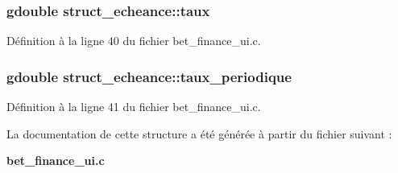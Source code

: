 \subsubsection[{taux}]{\setlength{\rightskip}{0pt plus 5cm}gdouble {\bf struct\_\-echeance::taux}}\label{structstruct__echeance_a1959986af776e4365ba4a8e6a009aa8b}


Définition à la ligne 40 du fichier bet\_\-finance\_\-ui.c.

\subsubsection[{taux\_\-periodique}]{\setlength{\rightskip}{0pt plus 5cm}gdouble {\bf struct\_\-echeance::taux\_\-periodique}}\label{structstruct__echeance_ae191c46200780181e2c8edca774d2e2a}


Définition à la ligne 41 du fichier bet\_\-finance\_\-ui.c.



La documentation de cette structure a été générée à partir du fichier suivant :\begin{DoxyCompactItemize}
\item 
{\bf bet\_\-finance\_\-ui.c}\end{DoxyCompactItemize}
